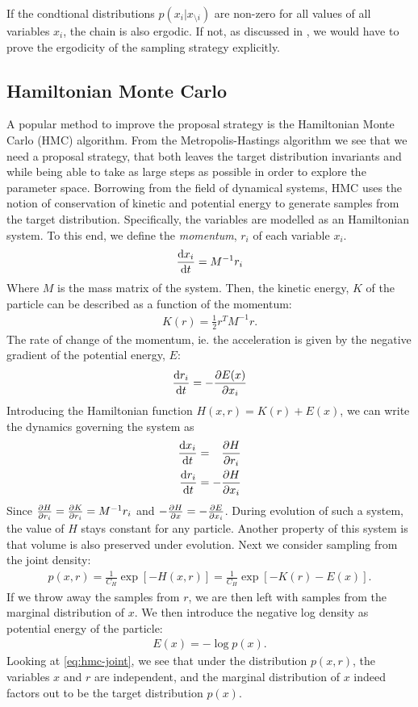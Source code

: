 If the condtional distributions $p(x_i|x_{\setminus i})$ are non-zero for all values of all variables $x_i$, the chain is also ergodic. If not, as discussed in \cite{bishop_pattern_2006}, we would have to prove the ergodicity of the sampling strategy explicitly.

\subsection{Hamiltonian Monte Carlo}

A popular method to improve the proposal strategy is the Hamiltonian Monte Carlo (HMC) algorithm. 
From the Metropolis-Hastings algorithm we see that we need a proposal strategy, that both leaves the target distribution invariants and while being able to take as large steps as possible in order to explore the parameter space.
Borrowing from the field of dynamical systems, HMC uses the notion of conservation of kinetic and potential energy to generate samples from the target distribution. 
Specifically, the variables are modelled as an Hamiltonian system. To this end, we define the \emph{momentum}, $r_i$ of each variable $x_i$.
\begin{align*}
    \dv{x_i}{t} = M^{-1} r_i
\end{align*}
Where $M$ is the mass matrix of the system. Then, the kinetic energy, $K$ of the particle can be described as a function of the momentum:
\begin{align*}
    K(r) = \frac{1}{2}r^T M^{-1} r.
\end{align*}
The rate of change of the momentum, ie. the acceleration is given by the negative gradient of the potential energy, $E$:
\begin{align*}
    \dv{r_i}{t} = -\pdv{E(x)}{x_i}
\end{align*}
Introducing the Hamiltonian function $H(x, r) = K(r) + E(x)$, we can write the dynamics governing the system as
\begin{align*}
    \dv{x_i}{t} &= \phantom{-}\pdv{H}{r_i}\\
    \dv{r_i}{t} &= -\pdv{H}{x_i}
\end{align*}
Since $\pdv{H}{r_i} = \pdv{K}{r_i} = M^{-1}r_i$ and $-\pdv{H}{x} = -\pdv{E}{x_i}$. During evolution of such a system, the value of $H$ stays constant for any particle. 
Another property of this system is that volume is also preserved under evolution. 
Next we consider sampling from the joint density:
\begin{align} \label{eq:hmc-joint}
    p(x, r) = \frac{1}{C_H} \exp\left[ -H(x, r)\right] = \frac{1}{C_H} \exp\left[-K(r) - E(x)  \right].
\end{align}
If we throw away the samples from $r$, we are then left with samples from the marginal distribution of $x$. We then introduce the negative log density as potential energy of the particle:
\begin{align*}
    E(x) = -\log{p(x)}.
\end{align*}
Looking at \cref{eq:hmc-joint}, we see that under the distribution $p(x, r)$, the variables $x$ and $r$ are independent, and the marginal distribution of $x$ indeed factors out to be the target distribution $p(x)$. 

